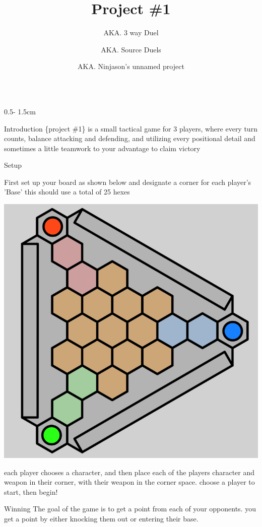 \documentclass{uioposter}
\title{Project \#1}
\author
{%
    AKA. 3 way Duel
    \and
    AKA. Source Duels
    \and
    AKA. Ninjason's unnamed project
}
\institute
{
    3 Players
    \and
    5-10 minutes
    \and
    ages 10?+ idk
}
\begin{document}
\begin{frame}
\begin{columns}[onlytextwidth]


\begin{column}{0.5\textwidth - 1.5cm}

    \begin{block}{Introduction}
        \{project \#1\} is a small tactical game for 3 players, where every turn counts, balance attacking and defending, and utilizing every positional detail and sometimes a little teamwork to your advantage to claim victory
    \end{block}

    \begin{block}{Setup}
        \raggedright
        First set up your board as shown below and designate a corner for each player's 'Base' this should use a total of 25 hexes
        \begin{center}
            \includegraphics[]{Img/3DuelBoard.png}
        \end{center}
        each player chooses a character, and then place each of the players character and weapon in their corner, with their weapon in the corner space. choose a player to start, then begin!
    \end{block}

    \begin{block}{Winning}
        The goal of the game is to get a point from each of your opponents. you get a point by either knocking them out or entering their base.
    \end{block}


\end{column}
\end{columns}
\end{frame}
\end{document}
